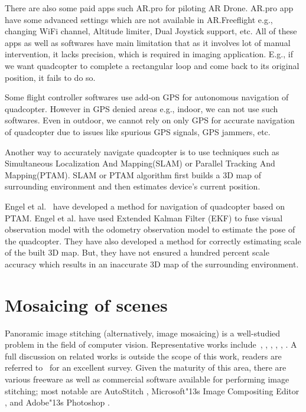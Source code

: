 There are also some paid apps such AR.pro for piloting AR Drone. AR.pro app
have some advanced settings which are not available in AR.Freeflight e.g.,
changing WiFi channel, Altitude limiter, Dual Joystick support, etc. All of
these apps as well as softwares have main limitation that as it involves lot of manual
intervention, it lacks precision, which is required in imaging application.
E.g., if we want quadcopter to complete a rectangular loop and come back to its original
position, it fails to do so. 

Some flight controller softwares use add-on GPS for autonomous navigation of
quadcopter. However in GPS denied areas e.g., indoor, we can not use such
softwares. Even in outdoor, we cannot rely on only GPS for accurate
navigation of quadcopter due to issues like spurious GPS signals, GPS jammers,
etc.

Another way to accurately navigate quadcopter is to use techniques such as
Simultaneous Localization And Mapping(SLAM)\cite{Davison:2007} or Parallel Tracking And
Mapping(PTAM)\cite{klein}. SLAM or PTAM algorithm first builds a 3D map of
surrounding environment and then estimates device's current position.

Engel et al.~\cite{Engel12} have developed a method for navigation of quadcopter
based on PTAM\cite{klein}. Engel et al. have used Extended Kalman Filter (EKF)
to fuse visual observation model with the odometry observation model to estimate
the pose of the quadcopter. They have also developed a method for
correctly estimating scale of the built 3D map. But, they have not ensured
a hundred percent scale accuracy which results in an inaccurate 3D map of
the surrounding environment.

\section{Mosaicing of scenes}
Panoramic image stitching (alternatively, image mosaicing) is a
well-studied problem in the field of computer vision.  Representative
works include~\cite{Milgram1975}, \cite{Milgram1977}, \cite{Capel},
\cite{Szeliski1997}, \cite{Brown07}, \cite{Brown03}.  A full discussion
on related works is outside the scope of this work, readers are
referred to~\cite{Szeliski05imagealignment} for an excellent survey.
Given the maturity of this area, there are various freeware as well as
commercial software available for performing image stitching; most
notable are AutoStitch \cite{autostitch}, Microsoft\textsc{\char"13}s Image
Compositing Editor \cite{ICE}, and Adobe\textsc{\char"13}s Photoshop
\cite{photoshop}.

